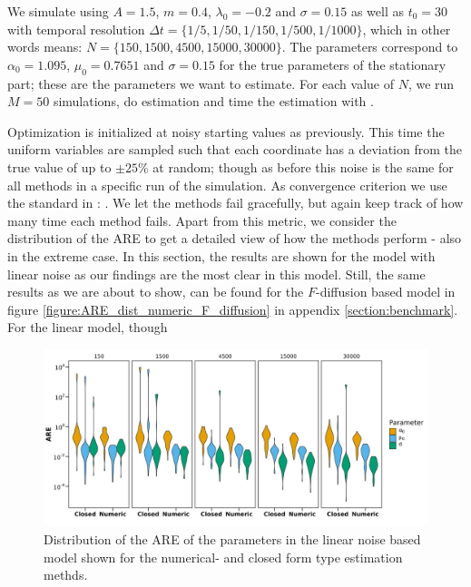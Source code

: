We simulate using $A = 1.5$, $m=0.4$, $\lambda_0 = -0.2$ and $\sigma =0.15$ as well as $t_0 = 30$ with temporal resolution $\Delta t = \{1/5, 1/50, 1/150, 1/500, 1/1000\}$, which in other words means: $N =  \{150, 1500, 4500, 15000, 30000\}$.  The parameters correspond to $\alpha_0 = 1.095$, $\mu_0 = 0.7651$ and $\sigma = 0.15$ for the true parameters of the stationary part; these are the parameters we want to estimate. For each value of $N$, we run $M = 50$ simulations, do estimation and time the estimation with .

Optimization is initialized at noisy starting values as previously. This time the uniform variables are sampled such that each coordinate has a deviation from the true value of up to $\pm 25\%$ at random; though as before this noise is the same for all methods in a specific run of the simulation. As convergence criterion we use the standard in : . We let the methods fail gracefully, but again keep track of how many time each method fails. Apart from this metric, we consider the distribution of the ARE to get a detailed view of how the methods perform - also in the extreme case. In this section, the results are shown for the model with linear noise as our findings are the most clear in this model. Still, the same results as we are about to show, can be found for the $F$-diffusion based model in figure \ref{figure:ARE_dist_numeric_F_diffusion} in appendix \ref{section:benchmark}. For the linear model, though
\begin{figure}[h!]
\begin{center}
    \includegraphics[scale = .1]{figures/ARE_dist_result_plot_Linear.jpeg}
    \caption{Distribution of the ARE of the parameters in the linear noise based model shown for the numerical- and closed form type estimation methds.}
    \label{figure:ARE_dist_linear_noise}
\end{center}
\end{figure}\\
